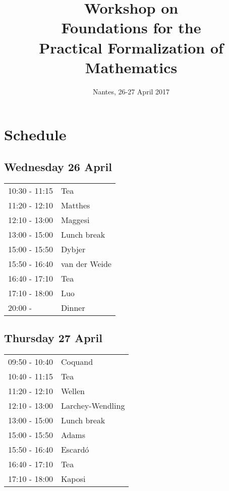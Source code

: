 \documentclass[a4paper,10pt]{scrartcl}
\title{Workshop on \\ Foundations for the \\ Practical Formalization of Mathematics}
\author{}
\begin{document}
\date{Nantes, 26-27 April 2017}
\maketitle

% 

\section*{Schedule}

\subsection*{Wednesday 26 April}

\begin{tabular}{ll}

10:30 - 11:15 & Tea \\
11:20 - 12:10 & Matthes \\
12:10 - 13:00  & Maggesi \\
13:00 - 15:00  & Lunch break\\
15:00 - 15:50  & Dybjer\\
15:50 - 16:40  & van der Weide \\
16:40 - 17:10  & Tea \\
17:10 - 18:00  & Luo \\
20:00 -        & Dinner
\end{tabular}

\subsection*{Thursday 27 April}

\begin{tabular}{ll}

09:50 - 10:40 & Coquand \\
10:40 - 11:15  & Tea \\
11:20 - 12:10  &Wellen \\
12:10 - 13:00 & Larchey-Wendling \\
13:00 - 15:00 & Lunch break \\
15:00 - 15:50 & Adams \\
15:50 - 16:40 & Escardó \\
16:40 - 17:10 & Tea \\
17:10 - 18:00 & Kaposi \\ 
\end{tabular}
  
\end{document}
